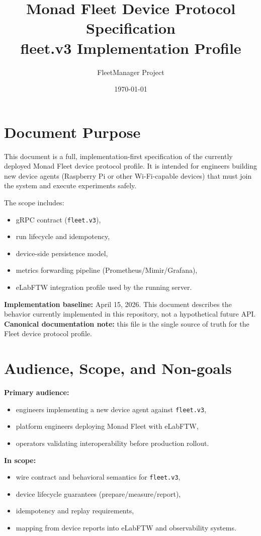 \documentclass[11pt,a4paper]{article}
\title{Monad Fleet Device Protocol Specification\\fleet.v3 Implementation Profile}
\author{FleetManager Project}
\date{\today}
\begin{document}
\maketitle
\tableofcontents
\newpage

\section{Document Purpose}
This document is a full, implementation-first specification of the currently deployed Monad Fleet device protocol profile.
It is intended for engineers building new device agents (Raspberry Pi or other Wi-Fi-capable devices) that must join the system and execute experiments safely.

The scope includes:
\begin{itemize}
  \item gRPC contract (\texttt{fleet.v3}),
  \item run lifecycle and idempotency,
  \item device-side persistence model,
  \item metrics forwarding pipeline (Prometheus/Mimir/Grafana),
  \item eLabFTW integration profile used by the running server.
\end{itemize}

\textbf{Implementation baseline:} April 15, 2026.
This document describes the behavior currently implemented in this repository, not a hypothetical future API.
\textbf{Canonical documentation note:} this file is the single source of truth for the Fleet device protocol profile.

\section{Audience, Scope, and Non-goals}
\textbf{Primary audience:}
\begin{itemize}
  \item engineers implementing a new device agent against \texttt{fleet.v3},
  \item platform engineers deploying Monad Fleet with eLabFTW,
  \item operators validating interoperability before production rollout.
\end{itemize}

\textbf{In scope:}
\begin{itemize}
  \item wire contract and behavioral semantics for \texttt{fleet.v3},
  \item device lifecycle guarantees (prepare/measure/report),
  \item idempotency and replay requirements,
  \item mapping from device reports into eLabFTW and observability systems.
\end{itemize}
\end{document}
